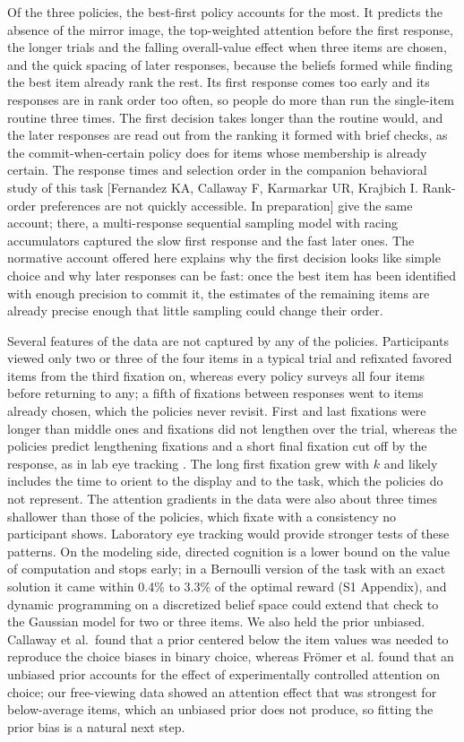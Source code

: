 \documentclass[10pt,letterpaper]{article}
\begin{document}
Of the three policies, the best-first policy accounts for the most. It
predicts the absence of the mirror image, the top-weighted attention
before the first response, the longer trials and the falling
overall-value effect when three items are chosen, and the quick spacing
of later responses, because the beliefs formed while finding the best
item already rank the rest. Its first response comes too early and its
responses are in rank order too often, so people do more than run the
single-item routine three times. The first decision takes longer than
the routine would, and the later responses are read out from the ranking
it formed with brief checks, as the commit-when-certain policy does for
items whose membership is already certain. The response times and
selection order in the companion behavioral study of this task
{[}Fernandez KA, Callaway F, Karmarkar UR, Krajbich I. Rank-order
preferences are not quickly accessible. In preparation{]} give the same
account; there, a multi-response sequential sampling model with racing
accumulators captured the slow first response and the fast later ones.
The normative account offered here explains why the first decision looks
like simple choice and why later responses can be fast: once the best
item has been identified with enough precision to commit it, the
estimates of the remaining items are already precise enough that little
sampling could change their order.

Several features of the data are not captured by any of the policies.
Participants viewed only two or three of the four items in a typical
trial and refixated favored items from the third fixation on, whereas
every policy surveys all four items before returning to any; a fifth of
fixations between responses went to items already chosen, which the
policies never revisit. First and last fixations were longer than middle
ones and fixations did not lengthen over the trial, whereas the policies
predict lengthening fixations and a short final fixation cut off by the
response, as in lab eye tracking \cite{krajbich2010,callaway2021}. The
long first fixation grew with \(k\) and likely includes the time to
orient to the display and to the task, which the policies do not
represent. The attention gradients in the data were also about three
times shallower than those of the policies, which fixate with a
consistency no participant shows. Laboratory eye tracking would provide
stronger tests of these patterns. On the modeling side, directed
cognition is a lower bound on the value of computation and stops early;
in a Bernoulli version of the task with an exact solution it came within
0.4\% to 3.3\% of the optimal reward (S1 Appendix), and dynamic
programming on a discretized belief space \cite{jang2021} could extend
that check to the Gaussian model for two or three items. We also held
the prior unbiased. Callaway et al.~found that a prior centered below
the item values was needed to reproduce the choice biases in binary
choice, whereas Frömer et al. \cite{fromer2025} found that an unbiased
prior accounts for the effect of experimentally controlled attention on
choice; our free-viewing data showed an attention effect that was
strongest for below-average items, which an unbiased prior does not
produce, so fitting the prior bias is a natural next step.
\end{document}
